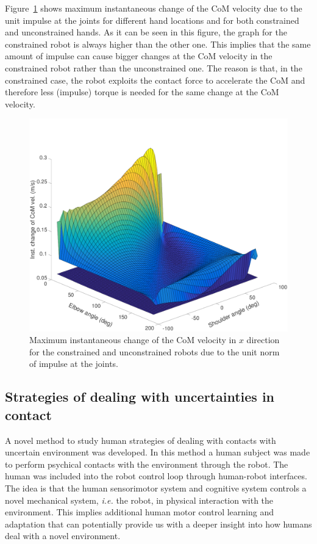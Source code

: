 \documentclass[final,5p,twocolumn]{elsarticle}
\begin{document}
Figure~\ref{type3} shows maximum instantaneous change of the CoM velocity due
to the unit impulse at the joints for different hand locations and for both
constrained and unconstrained hands. As it can be seen in this figure, the
graph for the constrained robot is always higher than the other one. This
implies that the same amount of impulse can cause bigger changes at the CoM
velocity in the constrained robot rather than the unconstrained one. The
reason is that, in the constrained case, the robot exploits the contact force
to accelerate the CoM and therefore less (impulse) torque is needed for the
same change at the CoM velocity.
\begin{figure}[!t]
  \centering
  \includegraphics[width=\linewidth]{images/type3.pdf}
  \caption{Maximum instantaneous change of the CoM velocity in $x$ direction
    for the constrained and unconstrained robots due to the unit norm of
    impulse at the joints.}
  \label{type3}
\end{figure}




\subsection{Strategies of dealing with uncertainties in contact}
A novel method to study human strategies of dealing with contacts with uncertain environment was developed. In this method a human subject was made to perform psychical
 contacts with the environment through the robot. The human was included into the robot control loop through human-robot interfaces. The idea is that the human sensorimotor system and cognitive system controls a novel mechanical system, \textit{i.e.} the robot, in physical interaction with the environment. This implies additional human motor control learning and adaptation that can potentially provide us with a deeper insight into how humans deal with a novel environment.
\end{document}
